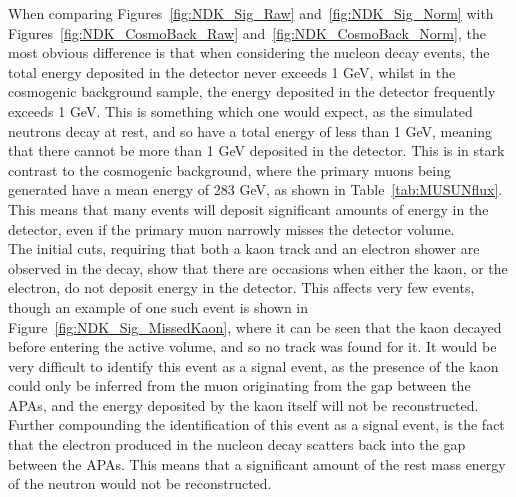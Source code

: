 When comparing Figures~\ref{fig:NDK_Sig_Raw} and~\ref{fig:NDK_Sig_Norm} with Figures~\ref{fig:NDK_CosmoBack_Raw} and~\ref{fig:NDK_CosmoBack_Norm}, the most obvious difference is that when considering the nucleon decay events, the total energy deposited in the detector never exceeds 1 GeV, whilst in the cosmogenic background sample, the energy deposited in the detector frequently exceeds 1 GeV. This is something which one would expect, as the simulated neutrons decay at rest, and so have a total energy of less than 1 GeV, meaning that there cannot be more than 1 GeV deposited in the detector. This is in stark contrast to the cosmogenic background, where the primary muons being generated have a mean energy of 283 GeV, as shown in Table~\ref{tab:MUSUNflux}. This means that many events will deposit significant amounts of energy in the detector, even if the primary muon narrowly misses the detector volume. \\

The initial cuts, requiring that both a kaon track and an electron shower are observed in the decay, show that there are occasions when either the kaon, or the electron, do not deposit energy in the detector. This affects very few events, though an example of one such event is shown in Figure~\ref{fig:NDK_Sig_MissedKaon}, where it can be seen that the kaon decayed before entering the active volume, and so no track was found for it. It would be very difficult to identify this event as a signal event, as the presence of the kaon could only be inferred from the muon originating from the gap between the APAs, and the energy deposited by the kaon itself will not be reconstructed. Further compounding the identification of this event as a signal event, is the fact that the electron produced in the nucleon decay scatters back into the gap between the APAs. This means that a significant amount of the rest mass energy of the neutron would not be reconstructed. \\


